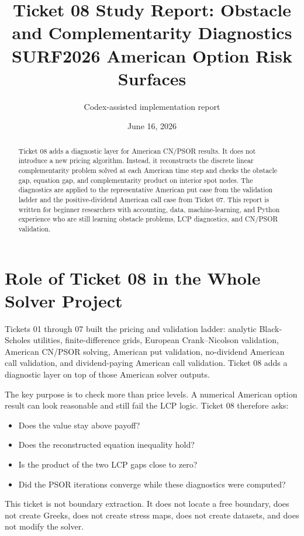 \documentclass[11pt,a4paper]{article}
\title{\textbf{Ticket 08 Study Report: Obstacle and Complementarity Diagnostics}\\
\large SURF2026 American Option Risk Surfaces}
\author{Codex-assisted implementation report}
\date{June 16, 2026}
\begin{document}
\maketitle

\begin{abstract}
Ticket 08 adds a diagnostic layer for American CN/PSOR results. It does not introduce a new
pricing algorithm. Instead, it reconstructs the discrete linear complementarity problem solved at
each American time step and checks the obstacle gap, equation gap, and complementarity product on
interior spot nodes. The diagnostics are applied to the representative American put case from the
validation ladder and the positive-dividend American call case from Ticket 07. This report is
written for beginner researchers with accounting, data, machine-learning, and Python experience
who are still learning obstacle problems, LCP diagnostics, and CN/PSOR validation.
\end{abstract}

\tableofcontents
\newpage

\section{Role of Ticket 08 in the Whole Solver Project}

Tickets 01 through 07 built the pricing and validation ladder: analytic Black-Scholes utilities,
finite-difference grids, European Crank--Nicolson validation, American CN/PSOR solving,
American put validation, no-dividend American call validation, and dividend-paying American call
validation. Ticket 08 adds a diagnostic layer on top of those American solver outputs.

The key purpose is to check more than price levels. A numerical American option result can look
reasonable and still fail the LCP logic. Ticket 08 therefore asks:
\begin{itemize}
  \item Does the value stay above payoff?
  \item Does the reconstructed equation inequality hold?
  \item Is the product of the two LCP gaps close to zero?
  \item Did the PSOR iterations converge while these diagnostics were computed?
\end{itemize}

This ticket is not boundary extraction. It does not locate a free boundary, does not create
Greeks, does not create stress maps, does not create datasets, and does not modify the solver.
\end{document}
